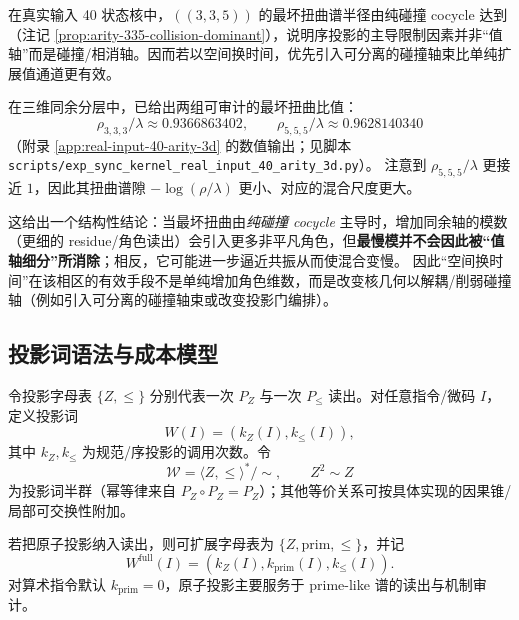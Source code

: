 \begin{remark}\label{rem:pom-collision-axis}
在真实输入 40 状态核中，\(((3,3,5))\) 的最坏扭曲谱半径由纯碰撞 cocycle 达到（注记 \ref{prop:arity-335-collision-dominant}），说明序投影的主导限制因素并非“值轴”而是碰撞/相消轴。因而若以空间换时间，优先引入可分离的碰撞轴束比单纯扩展值通道更有效。
\end{remark}

\begin{remark}\label{rem:pom-more-axis-slower}
在三维同余分层中，已给出两组可审计的最坏扭曲比值：
\[
\rho_{3,3,3}/\lambda\approx 0.9366863402,
\qquad
\rho_{5,5,5}/\lambda\approx 0.9628140340
\]
（附录 \ref{app:real-input-40-arity-3d} 的数值输出；见脚本 \texttt{scripts/exp\_sync\_kernel\_real\_input\_40\_arity\_3d.py}）。
注意到 \(\rho_{5,5,5}/\lambda\) 更接近 \(1\)，因此其扭曲谱隙 \(-\log(\rho/\lambda)\) 更小、对应的混合尺度更大。

这给出一个结构性结论：当最坏扭曲由\emph{纯碰撞 cocycle} 主导时，增加同余轴的模数（更细的 residue/角色读出）会引入更多非平凡角色，但\textbf{最慢模并不会因此被“值轴细分”所消除}；相反，它可能进一步逼近共振从而使混合变慢。
因此“空间换时间”在该相区的有效手段不是单纯增加角色维数，而是改变核几何以解耦/削弱碰撞轴（例如引入可分离的碰撞轴束或改变投影门编排）。
\end{remark}

\subsection{投影词语法与成本模型}\label{subsec:pom-words}
\begin{definition}[投影词与半群]\label{def:pom-projection-word}
令投影字母表 $\{Z,\le\}$ 分别代表一次 $P_Z$ 与一次 $P_{\le}$ 读出。对任意指令/微码 $I$，定义投影词
\[
W(I)=(k_Z(I),k_{\le}(I)),
\]
其中 $k_Z,k_{\le}$ 为规范/序投影的调用次数。令
\[
\mathcal{W}=\langle Z,\le\rangle^*/\sim,\qquad Z^2\sim Z
\]
为投影词半群（幂等律来自 $P_Z\circ P_Z=P_Z$）；其他等价关系可按具体实现的因果锥/局部可交换性附加。
\end{definition}

\begin{remark}[原子投影的扩展投影词]\label{rem:pom-word-prim}
若把原子投影纳入读出，则可扩展字母表为 $\{Z,\mathrm{prim},\le\}$，并记
\[
W^{\mathrm{full}}(I)=(k_Z(I),k_{\mathrm{prim}}(I),k_{\le}(I)).
\]
对算术指令默认 $k_{\mathrm{prim}}=0$，原子投影主要服务于 prime-like 谱的读出与机制审计。
\end{remark}

